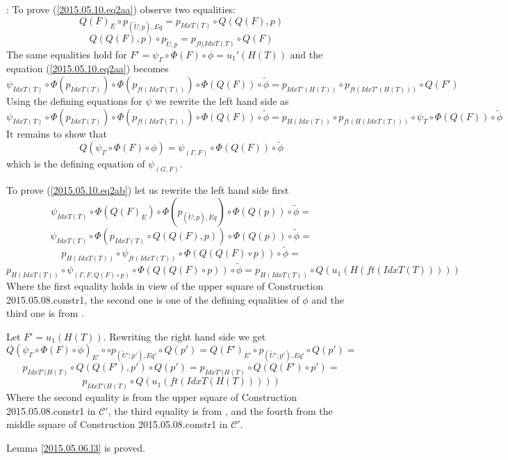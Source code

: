\documentclass[12pt]{article}
\newenvironment{myproof}{{\bf Proof}:}{\vskip 5mm }
\newcommand{\wt}{\widetilde}
\begin{document}
\begin{myproof}
To prove (\ref{2015.05.10.eq2aa}) observe two equalities:
%
$$Q(F)_E\circ p_{(\wt{U};p),Eq}=p_{IdxT(T)}\circ Q(Q(F),p)$$
%
$$Q(Q(F),p)\circ p_{\wt{U},p}=p_{ft(IdxT(T)}\circ Q(F)$$
%
The same equalities hold for $F'=\psi_{\Gamma}\circ\Phi(F)\circ \phi=u_1'(H(T))$ and the equation (\ref{2015.05.10.eq2aa}) becomes
%
$$\psi_{IdxT(T)}\circ \Phi(p_{IdxT(T)})\circ \Phi(p_{ft(IdxT(T))})\circ \Phi(Q(F))\circ \wt{\phi}=p_{IdxT'(H(T))}\circ p_{ft(IdxT'(H(T)))}\circ Q(F')$$
%
Using the defining equations for $\psi$ we rewrite the left hand side as
%
$$\psi_{IdxT(T)}\circ \Phi(p_{IdxT(T)})\circ \Phi(p_{ft(IdxT(T))})\circ \Phi(Q(F))\circ \wt{\phi}=p_{H(Idx(T))}\circ p_{ft(H(IdxT(T)))}\circ \psi_{T}\circ \Phi(Q(F))\circ \wt{\phi}$$
%
It remains to show that
%
$$Q(\psi_{\Gamma}\circ \Phi(F)\circ \phi)=\psi_{(\Gamma,F)}\circ \Phi(Q(F))\circ \wt{\phi}$$
%
which is the defining equation of $\psi_{(G,F)}$. 

To prove (\ref{2015.05.10.eq2ab}) let us rewrite the left hand side first
%
$$\psi_{IdxT(T)}\circ \Phi(Q(F)_E)\circ \Phi(p_{(\wt{U};p),Eq})\circ \Phi(Q(p))\circ \wt{\phi}=$$$$\psi_{IdxT(T)}\circ \Phi(p_{IdxT(T)}\circ Q(Q(F),p))\circ \Phi(Q(p))\circ\wt{\phi}=$$$$p_{H(IdxT(T))}\circ \psi_{ft(IdxT(T))}\circ \Phi(Q(Q(F)\circ p))\circ \wt{\phi}=$$$$p_{H(IdxT(T))}\circ \psi_{(\Gamma,F,Q(F)\circ p)}\circ \Phi(Q(Q(F)\circ p))\circ \wt{\phi}=p_{H(IdxT(T))}\circ Q(u_1(H(ft(IdxT(T)))))$$
%
Where the first equality holds in view of the upper square of Construction {2015.05.08.constr1}, the second one is one of the defining equalities of $\phi$ and the third one is from \cite[Lemma 3.2]{fromunivwithPi}. 

Let $F'=u_1(H(T))$. Rewriting the right hand side we get
%
$$Q(\psi_{\Gamma}\circ \Phi(F)\circ \phi)_{E'}\circ \circ p_{(\wt{U}';p'),Eq'}\circ Q(p')=Q(F')_{E'}\circ p_{(\wt{U}';p'),Eq'}\circ Q(p')=$$
$$p_{IdxT'(H(T)}\circ Q(Q(F'),p')\circ Q(p')=p_{IdxT'(H(T)}\circ Q(Q(F')\circ p')=$$
$$p_{IdxT'(H(T)}\circ Q(u_1(ft(IdxT(H(T)))))$$
%
Where the second equality is from the upper square of Construction {2015.05.08.constr1} in $\mathcal C'$, the third equality is from \cite[Lemma 3.2]{fromunivwithPi}, and the fourth from the middle square of Construction {2015.05.08.constr1} in $\mathcal C'$. 

Lemma \ref{2015.05.06.l3} is proved. 
\end{myproof}
\end{document}
